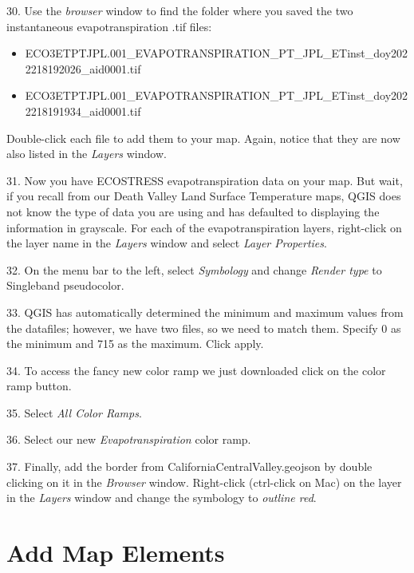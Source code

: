 \documentclass[oneside,a4paper,11pt,explicit]{book}
\begin{document}
30. Use the \textit{browser} window to find the folder where you saved the two instantaneous evapotranspiration .tif files: 
\begin{itemize}
	\item ECO3ETPTJPL.001\_EVAPOTRANSPIRATION\_PT\_JPL\_ETinst\_doy2022218192026\_aid0001.tif
	\item ECO3ETPTJPL.001\_EVAPOTRANSPIRATION\_PT\_JPL\_ETinst\_doy2022218191934\_aid0001.tif
\end{itemize}
Double-click each file to add them to your map. Again, notice that they are now also listed in the \textit{Layers} window.

31. Now you have ECOSTRESS evapotranspiration data on your map. But wait, if you recall from our Death Valley Land Surface Temperature maps, QGIS does not know the type of data you are using and has defaulted to displaying the information in grayscale. For each of the evapotranspiration layers, right-click on the layer name in the \textit{Layers} window and select \textit{Layer Properties}. 

32. On the menu bar to the left, select \textit{Symbology} and change \textit{Render type} to Singleband pseudocolor. 

33. QGIS has automatically determined the minimum and maximum values from the datafiles; however, we have two files, so we need to match them. Specify 0 as the minimum and 715 as the maximum. Click apply.

34. To access the fancy new color ramp we just downloaded click on the color ramp button.

35. Select \textit{All Color Ramps}.

36. Select our new \textit{Evapotranspiration} color ramp. 

37. Finally, add the border from CaliforniaCentralValley.geojson by double clicking on it in the \textit{Browser} window. Right-click (ctrl-click on Mac) on the layer in the \textit{Layers} window and change the symbology to \textit{outline red}. 


\section{Add Map Elements}
\end{document}
